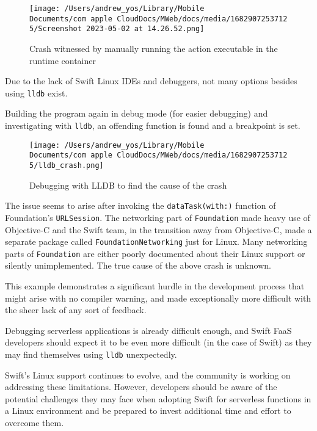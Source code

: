 \begin{figure}[h]
    \centering
    \texttt{[image: /Users/andrew\_yos/Library/Mobile Documents/com~apple~CloudDocs/MWeb/docs/media/16829072537125/Screenshot 2023-05-02 at 14.26.52.png]}
    \caption{Crash witnessed by manually running the action executable in the runtime container}
\end{figure}

Due to the lack of Swift Linux IDEs and debuggers, not many options besides using \texttt{lldb} exist.

Building the program again in debug mode (for easier debugging) and investigating with \texttt{lldb}, an offending function is found and a breakpoint is set.

\begin{figure}[h]
    \centering
    \texttt{[image: /Users/andrew\_yos/Library/Mobile Documents/com~apple~CloudDocs/MWeb/docs/media/16829072537125/lldb\_crash.png]}
    \caption{Debugging with LLDB to find the cause of the crash}
\end{figure}

The issue seems to arise after invoking the \texttt{dataTask(with:)} function of Foundation's \texttt{URLSession}. The networking part of \texttt{Foundation} made heavy use of Objective-C and the Swift team, in the transition away from Objective-C, made a separate package called \texttt{FoundationNetworking} just for Linux. Many networking parts of \texttt{Foundation} are either poorly documented about their Linux support or silently unimplemented. The true cause of the above crash is unknown.

This example demonstrates a significant hurdle in the development process that might arise with no compiler warning, and made exceptionally more difficult with the sheer lack of any sort of feedback.

Debugging serverless applications is already difficult enough, and Swift FaaS developers should expect it to be even more difficult (in the case of Swift) as they may find themselves using \texttt{lldb} unexpectedly.

Swift's Linux support continues to evolve, and the community is working on addressing these limitations. However, developers should be aware of the potential challenges they may face when adopting Swift for serverless functions in a Linux environment and be prepared to invest additional time and effort to overcome them.
    
